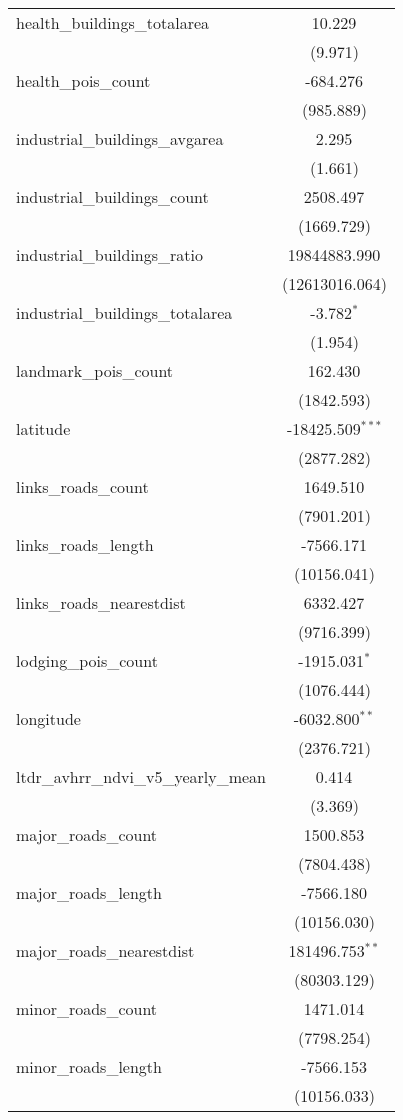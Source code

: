 \begin{table}[!htbp]
\begin{tabular}{@{\extracolsep{5pt}}lc}
 health_buildings_totalarea & 10.229$^{}$ \\
  & (9.971) \\
 health_pois_count & -684.276$^{}$ \\
  & (985.889) \\
 industrial_buildings_avgarea & 2.295$^{}$ \\
  & (1.661) \\
 industrial_buildings_count & 2508.497$^{}$ \\
  & (1669.729) \\
 industrial_buildings_ratio & 19844883.990$^{}$ \\
  & (12613016.064) \\
 industrial_buildings_totalarea & -3.782$^{*}$ \\
  & (1.954) \\
 landmark_pois_count & 162.430$^{}$ \\
  & (1842.593) \\
 latitude & -18425.509$^{***}$ \\
  & (2877.282) \\
 links_roads_count & 1649.510$^{}$ \\
  & (7901.201) \\
 links_roads_length & -7566.171$^{}$ \\
  & (10156.041) \\
 links_roads_nearestdist & 6332.427$^{}$ \\
  & (9716.399) \\
 lodging_pois_count & -1915.031$^{*}$ \\
  & (1076.444) \\
 longitude & -6032.800$^{**}$ \\
  & (2376.721) \\
 ltdr_avhrr_ndvi_v5_yearly_mean & 0.414$^{}$ \\
  & (3.369) \\
 major_roads_count & 1500.853$^{}$ \\
  & (7804.438) \\
 major_roads_length & -7566.180$^{}$ \\
  & (10156.030) \\
 major_roads_nearestdist & 181496.753$^{**}$ \\
  & (80303.129) \\
 minor_roads_count & 1471.014$^{}$ \\
  & (7798.254) \\
 minor_roads_length & -7566.153$^{}$ \\
  & (10156.033) \\

\end{tabular}
\end{table}
